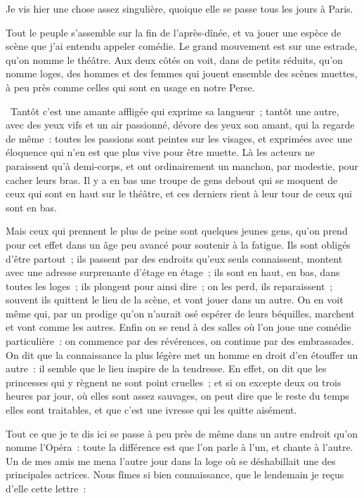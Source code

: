 \documentclass[french,twoside]{book} %
\begin{document}
\noindent Je vis hier une chose assez singulière, quoique elle se passe tous les jours à Paris.\par
Tout le peuple s’assemble sur la fin de l’après-dînée, et va jouer une espèce de scène que j’ai entendu appeler comédie. Le grand mouvement est sur une estrade, qu’on nomme le théâtre. Aux deux côtés on voit, dans de petits réduits, qu’on nomme loges, des hommes et des femmes qui jouent ensemble des scènes muettes, à peu près comme celles qui sont en usage en notre Perse.\par
 Tantôt c’est une amante affligée qui exprime sa langueur ; tantôt une autre, avec des yeux vifs et un air passionné, dévore des yeux son amant, qui la regarde de même : toutes les passions sont peintes sur les visages, et exprimées avec une éloquence qui n’en est que plus vive pour être muette. Là les acteurs ne paraissent qu’à demi-corps, et ont ordinairement un manchon, par modestie, pour cacher leurs bras. Il y a en bas une troupe de gens debout qui se moquent de ceux qui sont en haut sur le théâtre, et ces derniers rient à leur tour de ceux qui sont en bas.\par
Mais ceux qui prennent le plus de peine sont quelques jeunes gens, qu’on prend pour cet effet dans un âge peu avancé pour soutenir à la fatigue. Ils sont obligés d’être partout ; ils passent par des endroits qu’eux seuls connaissent, montent avec une adresse surprenante d’étage en étage ; ils sont en haut, en bas, dans toutes les loges ; ils plongent pour ainsi dire ; on les perd, ils reparaissent ; souvent ils quittent le lieu de la scène, et vont jouer dans un autre. On en voit même qui, par un prodige qu’on n’aurait osé espérer de leurs béquilles, marchent et vont comme les autres. Enfin on se rend à des salles où l’on joue une comédie particulière : on commence par des révérences, on continue par des embrassades. On dit que la connaissance la plus légère met un homme en droit d’en étouffer un autre : il semble que le lieu inspire de la tendresse. En effet, on dit que les princesses qui y règnent ne sont point cruelles ; et si on excepte deux ou trois heures par jour, où elles sont assez sauvages, on peut dire que le reste du temps elles sont traitables, et que c’est une ivresse qui les quitte aisément.\par
Tout ce que je te dis ici se passe à peu près de même dans un autre endroit qu’on nomme l’Opéra : toute la différence est que l’on parle à l’un, et chante à l’autre. Un de mes amis me mena l’autre jour dans la loge où se déshabillait une des principales actrices. Nous fîmes si bien connaissance, que le lendemain je reçus d’elle cette lettre :\par
\end{document}
